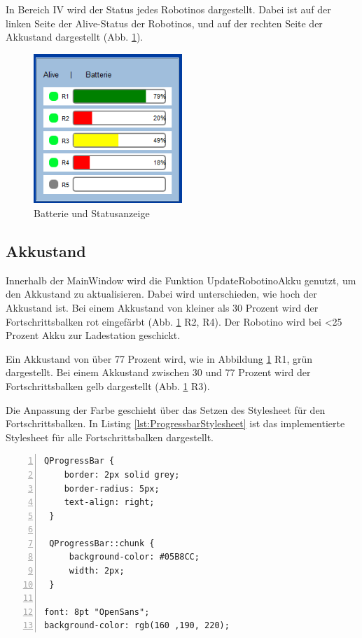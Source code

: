 In Bereich IV wird der Status jedes Robotinos dargestellt. Dabei ist auf der linken Seite der Alive-Status der Robotinos, und auf der rechten Seite der Akkustand dargestellt (Abb. \ref{fig:Batterie}). 

\begin{figure}[htb]
    \centering
    \includegraphics[width=0.5\textwidth]{Abbildungen/Batterie.png}
    \caption{Batterie und Statusanzeige}		
    \label{fig:Batterie}
\end{figure}

\subsection{Akkustand}

Innerhalb der MainWindow wird die Funktion UpdateRobotinoAkku genutzt, um den Akkustand zu aktualisieren. Dabei wird unterschieden, wie hoch der Akkustand ist. Bei einem Akkustand von kleiner als 30 Prozent wird der Fortschrittsbalken rot eingefärbt (Abb. \ref{fig:Batterie} R2, R4). Der Robotino wird bei <25 Prozent Akku zur Ladestation geschickt. 

Ein Akkustand von über 77 Prozent wird, wie in Abbildung \ref{fig:Batterie} R1, grün dargestellt. Bei einem Akkustand zwischen 30 und 77 Prozent wird der Fortschrittsbalken gelb dargestellt (Abb. \ref{fig:Batterie} R3). 

Die Anpassung der Farbe geschieht über das Setzen des Stylesheet für den Fortschrittsbalken. In Listing \ref{lst:ProgressbarStylesheet} ist das implementierte Stylesheet für alle Fortschrittsbalken dargestellt. 

\begin{lstlisting}[frame=single, breaklines=true, numbers=left, stepnumber=2, firstnumber=1, numberstyle = \tiny, caption=Progressbar Stylesheet ,label=lst:ProgressbarStylesheet]
QProgressBar {
    border: 2px solid grey;
    border-radius: 5px;
	text-align: right;
 }

 QProgressBar::chunk {
     background-color: #05B8CC;
     width: 2px;
 }

font: 8pt "OpenSans";
background-color: rgb(160 ,190, 220);
\end{lstlisting}

